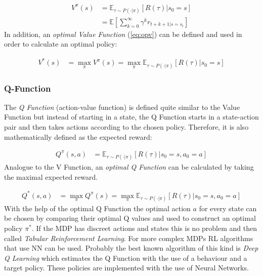 \begin{align}
	V^{\pi}(s) &= \mathbb{E}_{\tau \sim P(\cdot|\pi)}[R(\tau)|s_0=s] \\
	&= \mathbb{E}[\sum_{k=0}^{\infty}\gamma^k r_{t+k+1|s=s_t}]
\end{align}
\newline
In addition, an \emph{optimal Value Function} (\cref{eq:opv}) can be defined and used in order to calculate an optimal policy:

\begin{align}\label{eq:opv}
	V^*(s) &= \max_{\pi} V^{\pi}(s)
	= \max_{\pi} \mathbb{E}_{\tau \sim P(\cdot|\pi)}[R(\tau)|s_0=s]
\end{align} 

\subsubsection{Q-Function} \label{sec:Q}
The \emph{Q Function} (action-value function) is defined quite similar to the Value Function but instead of starting in a state, the Q Function starts in a state-action pair and then takes actions according to the chosen policy. Therefore, it is also mathematically defined as the expected reward:

\begin{align}
	Q^{\pi}(s,a) &= \mathbb{E}_{\tau \sim P(\cdot|\pi)}[R(\tau)|s_0=s, a_0=a]
\end{align}
\newline
Analogue to the V Function, an \emph{optimal Q Function} can be calculated by taking the maximal expected reward.

\begin{align} \label{eq:opq}
	Q^*(s,a) &= \max_{\pi} Q^{\pi}(s)
	= \max_{\pi} \mathbb{E}_{\tau \sim P(\cdot|\pi)}[R(\tau)|s_0=s, a_0=a]
\end{align}
\newline
With the help of the optimal Q Function the optimal action $a$ for every state can be chosen by comparing their optimal Q values and used to construct an optimal policy $\pi^*$. If the MDP has discreet actions and states this is no problem and then called \emph{Tabular Reinforcement Learning}. For more complex  MDPs RL algorithms that use NN can be used. Probably the best known algorithm of this kind is \emph{Deep Q Learning} \cite{pmlr-v120-yang20a} which estimates the Q Function with the use of a behaviour and a target policy. These policies are implemented with the use of Neural Networks.

\newpage

